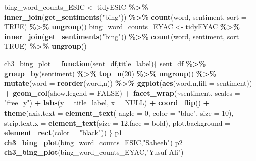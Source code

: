 \documentclass[
]{article}
\newenvironment{Shaded}{\begin{snugshade}}{\end{snugshade}}
\newcommand{\AttributeTok}[1]{\textcolor[rgb]{0.13,0.29,0.53}{#1}}
\newcommand{\ConstantTok}[1]{\textcolor[rgb]{0.56,0.35,0.01}{#1}}
\newcommand{\ControlFlowTok}[1]{\textcolor[rgb]{0.13,0.29,0.53}{\textbf{#1}}}
\newcommand{\DecValTok}[1]{\textcolor[rgb]{0.00,0.00,0.81}{#1}}
\newcommand{\FunctionTok}[1]{\textcolor[rgb]{0.13,0.29,0.53}{\textbf{#1}}}
\newcommand{\NormalTok}[1]{#1}
\newcommand{\OtherTok}[1]{\textcolor[rgb]{0.56,0.35,0.01}{#1}}
\newcommand{\SpecialCharTok}[1]{\textcolor[rgb]{0.81,0.36,0.00}{\textbf{#1}}}
\newcommand{\StringTok}[1]{\textcolor[rgb]{0.31,0.60,0.02}{#1}}
\begin{document}
\begin{Shaded}
\begin{Highlighting}[]
\NormalTok{bing\_word\_counts\_ESIC }\OtherTok{\textless{}{-}}\NormalTok{ tidyESIC }\SpecialCharTok{\%\textgreater{}\%}
  \FunctionTok{inner\_join}\NormalTok{(}\FunctionTok{get\_sentiments}\NormalTok{(}\StringTok{"bing"}\NormalTok{)) }\SpecialCharTok{\%\textgreater{}\%}
  \FunctionTok{count}\NormalTok{(word, sentiment, }\AttributeTok{sort =} \ConstantTok{TRUE}\NormalTok{) }\SpecialCharTok{\%\textgreater{}\%}
  \FunctionTok{ungroup}\NormalTok{()}
\NormalTok{bing\_word\_counts\_EYAC }\OtherTok{\textless{}{-}}\NormalTok{ tidyEYAC }\SpecialCharTok{\%\textgreater{}\%}
  \FunctionTok{inner\_join}\NormalTok{(}\FunctionTok{get\_sentiments}\NormalTok{(}\StringTok{"bing"}\NormalTok{)) }\SpecialCharTok{\%\textgreater{}\%}
  \FunctionTok{count}\NormalTok{(word, sentiment, }\AttributeTok{sort =} \ConstantTok{TRUE}\NormalTok{) }\SpecialCharTok{\%\textgreater{}\%}
  \FunctionTok{ungroup}\NormalTok{()}

\NormalTok{ch3\_bing\_plot }\OtherTok{=} \ControlFlowTok{function}\NormalTok{(sent\_df,title\_label)\{}
\NormalTok{  sent\_df }\SpecialCharTok{\%\textgreater{}\%} 
    \FunctionTok{group\_by}\NormalTok{(sentiment) }\SpecialCharTok{\%\textgreater{}\%} 
    \FunctionTok{top\_n}\NormalTok{(}\DecValTok{20}\NormalTok{) }\SpecialCharTok{\%\textgreater{}\%} \FunctionTok{ungroup}\NormalTok{() }\SpecialCharTok{\%\textgreater{}\%} 
    \FunctionTok{mutate}\NormalTok{(}\AttributeTok{word =} \FunctionTok{reorder}\NormalTok{(word,n)) }\SpecialCharTok{\%\textgreater{}\%} 
    \FunctionTok{ggplot}\NormalTok{(}\FunctionTok{aes}\NormalTok{(word,n,}\AttributeTok{fill =}\NormalTok{ sentiment)) }\SpecialCharTok{+}
      \FunctionTok{geom\_col}\NormalTok{(}\AttributeTok{show.legend =} \ConstantTok{FALSE}\NormalTok{) }\SpecialCharTok{+}
      \FunctionTok{facet\_wrap}\NormalTok{(}\SpecialCharTok{\textasciitilde{}}\NormalTok{sentiment, }\AttributeTok{scales =} \StringTok{"free\_y"}\NormalTok{) }\SpecialCharTok{+}
      \FunctionTok{labs}\NormalTok{(}\AttributeTok{y =}\NormalTok{ title\_label, }\AttributeTok{x =} \ConstantTok{NULL}\NormalTok{) }\SpecialCharTok{+}
      \FunctionTok{coord\_flip}\NormalTok{() }\SpecialCharTok{+}
      \FunctionTok{theme}\NormalTok{(}\AttributeTok{axis.text =} \FunctionTok{element\_text}\NormalTok{(}
                        \AttributeTok{angle =} \DecValTok{0}\NormalTok{,}
                        \AttributeTok{color =} \StringTok{"blue"}\NormalTok{,}
                        \AttributeTok{size =} \DecValTok{10}\NormalTok{),}
            \AttributeTok{strip.text.x =} \FunctionTok{element\_text}\NormalTok{(}\AttributeTok{size =} \DecValTok{12}\NormalTok{,}\AttributeTok{face =} \StringTok{\textquotesingle{}bold\textquotesingle{}}\NormalTok{),}
            \AttributeTok{plot.background =} \FunctionTok{element\_rect}\NormalTok{(}\AttributeTok{color =} \StringTok{"black"}\NormalTok{))}
\NormalTok{\}}
\NormalTok{p1 }\OtherTok{=} \FunctionTok{ch3\_bing\_plot}\NormalTok{(bing\_word\_counts\_ESIC,}\StringTok{"Saheeh"}\NormalTok{)}
\NormalTok{p2 }\OtherTok{=} \FunctionTok{ch3\_bing\_plot}\NormalTok{(bing\_word\_counts\_EYAC,}\StringTok{"Yusuf Ali"}\NormalTok{)}


\end{Highlighting}
\end{Shaded}
\end{document}
